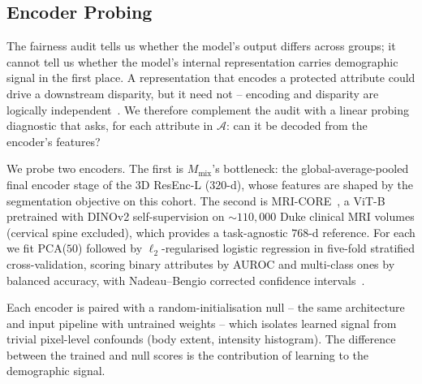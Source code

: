\subsection{Encoder Probing}
\label{sec:probing_method}

The fairness audit tells us whether the model's output differs across groups; it
cannot tell us whether the model's internal representation carries demographic
signal in the first place. A representation that encodes a protected attribute
could drive a downstream disparity, but it need not -- encoding and disparity are
logically independent~\cite{petersen2023feature}. We therefore complement the
audit with a linear probing diagnostic that asks, for each attribute in
$\mathcal{A}$: can it be decoded from the encoder's features?

We probe two encoders. The first is $M_{\mathrm{mix}}$'s bottleneck: the
global-average-pooled final encoder stage of the 3D ResEnc-L ($320$-d), whose
features are shaped by the segmentation objective on this cohort. The second is
MRI-CORE~\cite{dong2025mricore}, a ViT-B pretrained with DINOv2 self-supervision
on ${\sim}110{,}000$ Duke clinical MRI volumes (cervical spine excluded), which
provides a task-agnostic $768$-d reference. For each we fit PCA($50$) followed by
$\ell_2$-regularised logistic regression in five-fold stratified
cross-validation, scoring binary attributes by AUROC and multi-class ones by
balanced accuracy, with Nadeau--Bengio corrected confidence
intervals~\cite{nadeau2003inference}.

Each encoder is paired with a random-initialisation null -- the same architecture
and input pipeline with untrained weights -- which isolates learned signal from
trivial pixel-level confounds (body extent, intensity histogram). The difference
between the trained and null scores is the contribution of learning to the
demographic signal.
